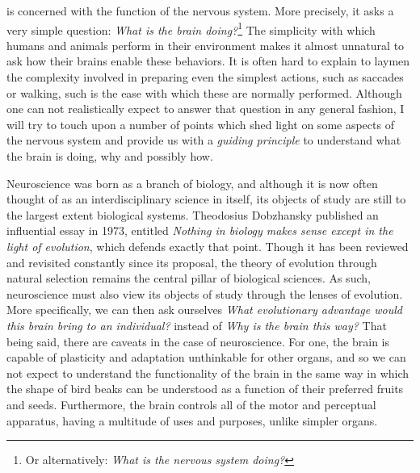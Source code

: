  is concerned with the function of the nervous system. More precisely, it asks a very simple question: {\em What is the brain 
doing?}\footnote{ Or alternatively: {\em What is the nervous system doing?}} The simplicity with which humans and animals perform in their environment makes it 
almost unnatural to ask how their brains enable these behaviors. It is often hard to explain to laymen the complexity involved in preparing even the simplest actions, 
such as saccades or walking, such is the ease with which these are normally performed. Although one can not realistically expect to answer that question in any 
general fashion, I will try to touch upon a number of points which shed light on some aspects of the nervous system and provide us with a {\em guiding principle} to 
understand what the brain is doing, why and possibly how.\par

Neuroscience was born as a branch of biology, and although it is now often thought of as  an interdisciplinary science in itself, its objects of study are still to the 
largest extent biological systems. Theodosius Dobzhansky published an influential essay in 1973, entitled {\em Nothing in biology makes sense except in the light of 
evolution},\cite{Dobzhansky1973} which defends exactly that point. Though it has been reviewed and revisited constantly since its proposal, the theory of evolution 
through natural selection remains the central pillar of biological sciences. As such, neuroscience must also view its objects of study through the lenses of evolution. 
More specifically, we can then ask ourselves {\em What evolutionary advantage would this brain bring to an individual?} instead of {\em Why is the brain this way?} 
That being said,  there are caveats in the case of neuroscience. For one, the brain is capable of plasticity and adaptation unthinkable for other organs, and so we can 
not expect to understand the functionality of the brain in the same way in which the shape of bird beaks can be understood as a function of their preferred fruits and 
seeds. Furthermore, the brain controls all of the motor and perceptual apparatus, having a multitude of uses and purposes, unlike simpler organs.\par

